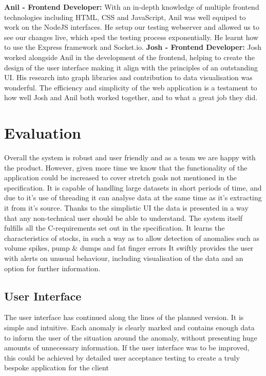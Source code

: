 \documentclass[12pt]{article}
\begin{document}
  \newline\newline\textbf{Anil - Frontend Developer:}\newline
  With an in-depth knowledge of multiple frontend technologies including HTML, CSS and JavaScript, Anil was well equiped to work on the NodeJS interfaces.
  He setup our testing webserver and allowed us to see our changes live, which sped the testing process exponentially. He learnt how to use the Express framework
  and Socket.io.
  \newline\newline\textbf{Josh - Frontend Developer:}\newline
  Josh worked alongside Anil in the development of the frontend, helping to create the design of the user interface making it align with the principles of an outstanding UI.
  His research into graph libraries and contribution to data visualisation was wonderful.
  The efficiency and simplicity of the web application is a testament to how well Josh and Anil both worked together, and to what a great job they did.
\section{Evaluation}
Overall the system is robust and user friendly and as a team we are happy with the product. However, given more time we know that the functionality of the application could be increased to cover stretch goals not mentioned in the specification.
It is capable of handling large datasets in short periods of time, and due to it’s use of threading it can analyse data at the same time as it’s extracting it from it’s source.
Thanks to the simplistic UI the data is presented in a way that any non-technical user should be able to understand.
The system itself fulfills all the C-requirements set out in the specification. It learns the characteristics of stocks, in such a way as to allow detection of anomalies such as volume spikes, pump \& dumps and fat finger errors
It swiftly provides the user with alerts on unusual behaviour, including visualisation of the data and an option for further information.
\subsection{User Interface}
The user interface has continued along the lines of the planned version. It is simple and intuitive.
Each anomaly is clearly marked and contains enough data to inform the user of the situation around the anomaly, without presenting huge amounts of unnecessary information.
If the user interface was to be improved, this could be achieved by detailed user acceptance testing to create a truly bespoke application for the client
\end{document}
